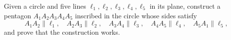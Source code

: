 Given a circle and five lines $\ell_1,\ell_2,\ell_3,\ell_4,\ell_5$ in its plane, construct a pentagon $A_1A_2A_3A_4A_5$ inscribed in the circle whose sides satisfy
\[
A_1A_2\parallel\ell_1,\quad A_2A_3\parallel\ell_2,\quad A_3A_4\parallel\ell_3,\quad A_4A_5\parallel\ell_4,\quad A_5A_1\parallel\ell_5,
\]
and prove that the construction works.

